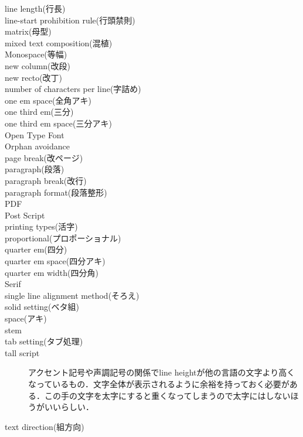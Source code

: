 \begin{description}
    \item[line length(行長)]
    \item[line-start prohibition rule(行頭禁則)]
    \item[matrix(母型)]
    \item[mixed text composition(混植)]
    \item[Monospace(等幅)]
    \item[new column(改段)]
    \item[new recto(改丁)]
    \item[number of characters per line(字詰め)]
    \item[one em space(全角アキ)]
    \item[one third em(三分)]
    \item[one third em space(三分アキ)]
    \item[Open Type Font]
    \item[Orphan avoidance]
    \item[page break(改ページ)]
    \item[paragraph(段落)]
    \item[paragraph break(改行)]
    \item[paragraph format(段落整形)]
    \item[PDF]
    \item[Post Script]
    \item[printing types(活字)]
    \item[proportional(プロポーショナル)]
    \item[quarter em(四分)]
    \item[quarter em space(四分アキ)]
    \item[quarter em width(四分角)]
    \item[Serif]
    \item[single line alignment method(そろえ)]
    \item[solid setting(ベタ組)]
    \item[space(アキ)]
    \item[stem]
    \item[tab setting(タブ処理)]
    \item[tall script]アクセント記号や声調記号の関係でline heightが他の言語の文字より高くなっているもの．文字全体が表示されるように余裕を持っておく必要がある\cite{developer.apple.com:videos/play/wwdc2016/201/}．この手の文字を太字にすると重くなってしまうので太字にはしないほうがいいらしい\cite{material.io:design/typography/language-support.html}．
    \item[text direction(組方向)]

\end{description}
